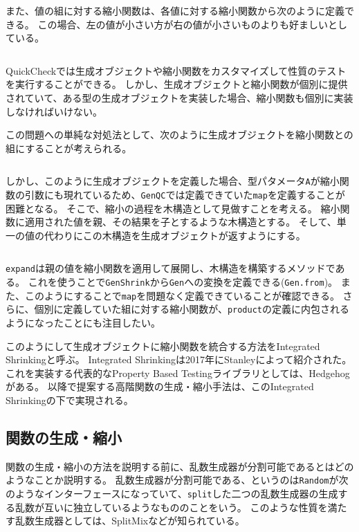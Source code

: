 \documentclass[a4paper,xelatex,ja=standard,jafont=noto]{bxjsarticle}
\theoremstyle{definition}
\begin{document}
\inputminted[breaklines,firstline=40,lastline=43]{scala}{../src/main/scala/minicheck.scala}

また、値の組に対する縮小関数は、各値に対する縮小関数から次のように定義できる。
この場合、左の値が小さい方が右の値が小さいものよりも好ましいとしている。

\inputminted[breaklines,firstline=45,lastline=47]{scala}{../src/main/scala/minicheck.scala}

QuickCheckでは生成オブジェクトや縮小関数をカスタマイズして性質のテストを実行することができる。
しかし、生成オブジェクトと縮小関数が個別に提供されていて、ある型の生成オブジェクトを実装した場合、縮小関数も個別に実装しなければいけない。

この問題への単純な対処法として、次のように生成オブジェクトを縮小関数との組にすることが考えられる。

\inputminted[breaklines,firstline=49,lastline=49]{scala}{../src/main/scala/minicheck.scala}

しかし、このように生成オブジェクトを定義した場合、型パタメータ\texttt{A}が縮小関数の引数にも現れているため、\texttt{GenQC}では定義できていた\texttt{map}を定義することが困難となる。
そこで、縮小の過程を木構造として見做すことを考える。
縮小関数に適用された値を親、その結果を子とするような木構造とする。
そして、単一の値の代わりにこの木構造を生成オブジェクトが返すようにする。

\inputminted[breaklines,firstline=51,lastline=66]{scala}{../src/main/scala/minicheck.scala}

\texttt{expand}は親の値を縮小関数を適用して展開し、木構造を構築するメソッドである。
これを使うことで\texttt{GenShrink}から\texttt{Gen}への変換を定義できる(\texttt{Gen.from})。
また、このようにすることで\texttt{map}を問題なく定義できていることが確認できる。
さらに、個別に定義していた組に対する縮小関数が、\texttt{product}の定義に内包されるようになったことにも注目したい。

このようにして生成オブジェクトに縮小関数を統合する方法をIntegrated Shrinkingと呼ぶ。
Integrated Shrinkingは2017年にStanleyによって紹介された\cite{stanley_gens_2017}。
これを実装する代表的なProperty Based Testingライブラリとしては、Hedgehog\cite{hedgehog_online}がある。
以降で提案する高階関数の生成・縮小手法は、このIntegrated Shrinkingの下で実現される。

\subsection{関数の生成・縮小}

関数の生成・縮小の方法を説明する前に、乱数生成器が分割可能であるとはどのようなことか説明する。
乱数生成器が分割可能である、というのは\texttt{Random}が次のようなインターフェースになっていて、\texttt{split}した二つの乱数生成器の生成する乱数が互いに独立しているようなもののことをいう。
このような性質を満たす乱数生成器としては、SplitMix\cite{steele_jr_fast_2014}などが知られている。
\end{document}
